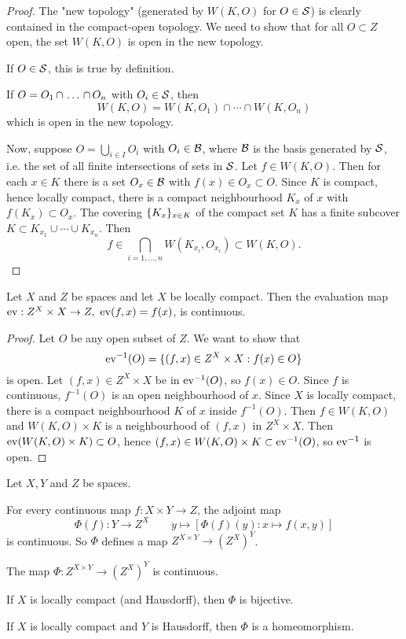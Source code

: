 \begin{proof}
The "new topology" (generated by $W(K,O)$ for $O\in\S$) is clearly contained in the compact-open topology. We need to show that for all $O\subset Z$ open, the set $W(K,O)$ is open in the new topology.

If $O\in\S$, this is true by definition.

If $O=\nns{O}{\cap}{n}$ with $O_i\in\S$, then
\[W(K,O)=W(K,O_1)\cap\cdots\cap W(K,O_n)\]
which is open in the new topology.

Now, suppose $O=\bigcup_{i\in I}O_i$ with $O_i\in\Bb$, where $\Bb$ is the basis generated by $\S$, i.e. the set of all finite intersections of sets in $\S$. Let $f\in W(K,O)$. Then for each $x\in K$ there is a set $O_x\in\Bb$ with $f(x)\in O_x\subset O$. Since $K$ is compact, hence locally compact, there is a compact neighbourhood $K_x$ of $x$ with $f(K_x)\subset O_x$. The covering $\cb{K_x}_{x\in K}$ of the compact set $K$ has a finite subcover $K\subset K_{x_1}\cup\cdots\cup K_{x_n}$. Then
\[f\in \bigcap_{i=1,\dots,n}W(K_{x_i},O_{x_i})\subset W(K,O).\]
\end{proof}

\begin{theorem}
Let $X$ and $Z$ be spaces and let $X$ be locally compact. Then the evaluation map $\ev:Z^X\times X\to Z,\ \ev(f,x)=f(x)$, is continuous.
\end{theorem}

\begin{proof}
Let $O$ be any open subset of $Z$. We want to show that
\[\ev^{-1}(O)=\cb{(f,x)\in Z^X\times X:f(x)\in O}\]
is open. Let $(f,x)\in Z^X\times X$ be in $\ev^{-1}(O)$, so $f(x)\in O$. Since $f$ is continuous, $f^{-1}(O)$ is an open neighbourhood of $x$. Since $X$ is locally compact, there is a compact neighbourhood $K$ of $x$ inside $f^{-1}(O)$. Then $f\in W(K,O)$ and $W(K,O)\times K$ is a neighbourhood of $(f,x)$ in $Z^X\times X$. Then $\ev(W(K,O)\times K)\subset O$, hence $(f,x)\in W(K,O)\times K\subset\ev^{-1}(O)$, so $\ev^{-1}$ is open.
\end{proof}

\begin{theorem}
Let $X,Y$ and $Z$ be spaces.
\begin{numerate}
    \setcounter{enumi}{-1}
    \item For every continuous map $f:X\times Y\to Z$, the adjoint map 
    $$\Phi(f):Y\longrightarrow Z^X \qquad y\longmapsto [\Phi(f)(y):x\mapsto f(x,y)]$$
     is continuous. So $\Phi$ defines a map $Z^{X\times Y}\to(Z^X)^Y$.
    \item The map $\Phi:Z^{X\times Y}\to(Z^X)^Y$ is continuous.
    \item If $X$ is locally compact (and Hausdorff), then $\Phi$ is bijective.
    \item If $X$ is locally compact and $Y$ is Hausdorff, then $\Phi$ is a homeomorphism.
\end{numerate}
\end{theorem}

